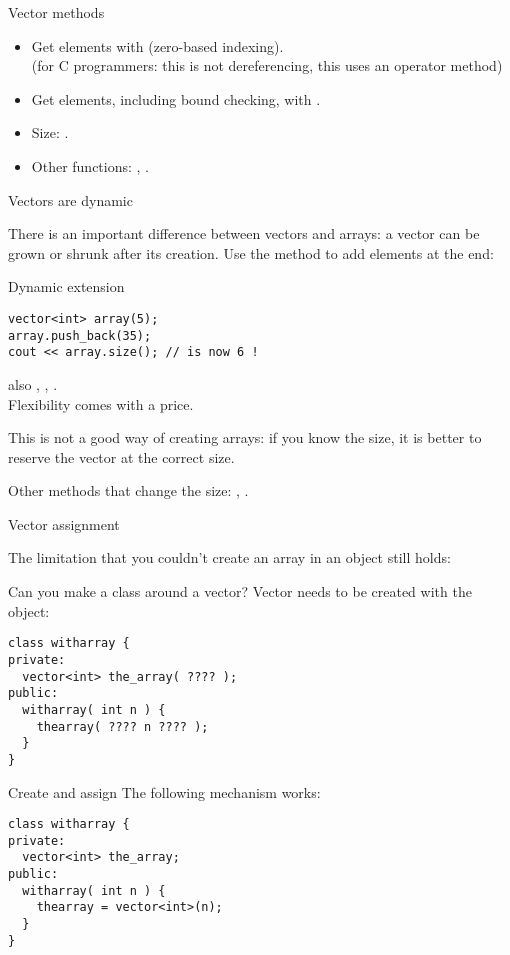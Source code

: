 \begin{slide}{Vector methods}
  \label{sl:vector-method}
  \begin{itemize}
  \item Get elements with  (zero-based indexing).\\
    (for C programmers: this is not dereferencing, this uses an
    operator method)
  \item Get elements, including bound checking, with .
  \item Size: .
  \item Other functions: , .
  \end{itemize}
\end{slide}

 {Vectors are dynamic}
\label{sec:stdvector-dynamic}

There is an important difference between vectors and arrays: a vector
can be grown or shrunk after its creation.
Use the  method to add elements at the end:

\begin{block}{Dynamic extension}
  \label{sl:vector-dynamic}
\begin{verbatim}
vector<int> array(5);
array.push_back(35);
cout << array.size(); // is now 6 !
\end{verbatim}
also , , .\\
Flexibility comes with a price.
\end{block}

This is not a good way of creating arrays: if you know the size, it is
better to reserve the vector at the correct size.

Other methods that change the size: , .

 {Vector assignment}

The limitation that you couldn't create an array in an object still
holds:

\begin{block}{Can you make a class around a vector?}
  \label{sl:class-with-vector}
  Vector needs to be created with the object:
\begin{verbatim}
class witharray {
private:
  vector<int> the_array( ???? );
public:
  witharray( int n ) {
    thearray( ???? n ???? );
  }
}
\end{verbatim}
\end{block}

\begin{block}{Create and assign}
  \label{sl:class-has-vector}
  The following mechanism works:
\begin{verbatim}
class witharray {
private:
  vector<int> the_array;
public:
  witharray( int n ) {
    thearray = vector<int>(n);
  }
}
\end{verbatim}
\end{block}

